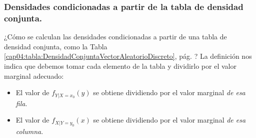 \subsubsection{Densidades condicionadas a partir de la tabla de densidad conjunta.}

¿Cómo se calculan las densidades condicionadas a partir de una tabla de densidad conjunta, como la Tabla \ref{cap04:tabla:DensidadConjuntaVectorAleatorioDiscreto}, pág. \pageref{cap04:tabla:DensidadConjuntaVectorAleatorioDiscreto}? La definición nos indica que debemos tomar cada elemento de la tabla y dividirlo por el valor marginal adecuado:
\begin{itemize}
  \item El valor de $f_{Y|X=x_0}(y)$  se obtiene dividiendo por el valor marginal {\em de esa fila}.
  \item El valor de $f_{X|Y=y_0}(x)$  se obtiene dividiendo por el valor marginal {\em de esa columna}.
\end{itemize}

